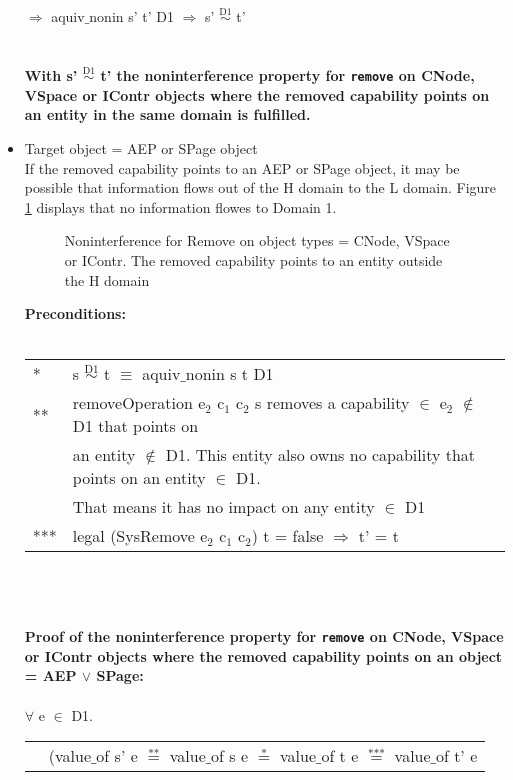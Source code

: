 \begin{itemize}
$\Rightarrow$ aquiv$\_$nonin s' t' D1 $\Rightarrow$ s' $\overset{\text{D1}}{\sim}$ t' \\ \\ \\
\textbf{With s' $\overset{\text{D1}}{\sim}$ t' the noninterference property for \texttt{remove} on CNode, VSpace or IContr objects where the removed capability points on an entity in the same domain is fulfilled.}  
\clearpage
\item Target object = AEP or SPage object \\
If the removed capability points to an AEP or SPage object, it may be possible that information flows out of the H domain to the L domain. Figure \ref{fig:RemoveOutside} displays that no information flowes to Domain 1.
\begin{flushleft}
\begin{figure}[H]
\caption{Noninterference for Remove on object types = CNode, VSpace or IContr. The removed capability points to an entity outside the H domain}
\label{fig:RemoveOutside}
\end{figure}
\end{flushleft}
\textbf{Preconditions:} \\ \\
\begin{tabular}{ll}
* & s $\overset{\text{D1}}{\sim}$ t $\equiv$ aquiv$\_$nonin s t D1	\\ 
** & removeOperation e$_2$ c$_1$ c$_2$ s removes a capability $\in$ e$_2$ $\notin$ D1 that points on \\
& an entity $\notin$ D1. This entity also owns no capability that points on an entity $\in$ D1. \\
& That means it has no impact on any entity $\in$ D1 \\ 
*** & legal (SysRemove e$_2$ c$_1$ c$_2$) t = false $\Rightarrow$ t' = t
\end{tabular} \\ \\ \\
\textbf{Proof of the noninterference property for \texttt{remove} on CNode, VSpace or IContr objects where the removed capability points on an object = AEP $\vee$ SPage:}\\ \\
$\forall$ e $\in$ D1. \\
\begin{tabular}{ll}
& (value$\_$of s' e $\overset{\text{**}}{=}$ value$\_$of s e $\overset{\text{*}}{=}$ value$\_$of t e $\overset{\text{***}}{=}$ value$\_$of t' e \\

\end{tabular}
\end{itemize}
